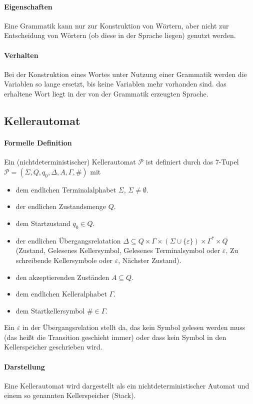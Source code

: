 \paragraph{Eigenschaften}
Eine Grammatik kann nur zur Konstruktion von Wörtern, aber nicht zur Entscheidung von Wörtern (ob diese in der Sprache liegen) genutzt werden.

\paragraph{Verhalten}
Bei der Konstruktion eines Wortes unter Nutzung einer Grammatik werden die Variablen so lange ersetzt, bis keine Variablen mehr vorhanden sind. das erhaltene Wort liegt in der von der Grammatik erzeugten Sprache.


\subsection{Kellerautomat}
\paragraph{Formelle Definition}
Ein (nichtdeterministischer) Kellerautomat $ \mathcal{P} $ ist definiert durch das 7-Tupel $ \mathcal{P} = (\Sigma, Q, q _ 0, \Delta, A, \Gamma, \#) $ mit
\begin{itemize}
	\item dem endlichen Terminalalphabet $ \Sigma $, $ \Sigma \neq \emptyset $.
	\item der endlichen Zustandsmenge $ Q $.
	\item dem Startzustand $ q _ 0 \in Q $.
	\item der endlichen Übergangsrelatation $ \Delta \subseteq Q \times \Gamma \times (\Sigma \cup \{ \varepsilon \}) \times \Gamma ^ * \times Q $ (Zustand, Gelesenes Kellersymbol, Gelesenes Terminalsymbol oder $ \varepsilon $, Zu schreibende Kellersymbole oder $ \varepsilon $, Nächster Zustand).
	\item den akzeptierenden Zuständen $ A \subseteq Q $.
	\item dem endlichen Kelleralphabet $ \Gamma $.
	\item dem Startkellersymbol $ \# \in \Gamma $.
\end{itemize}
Ein $ \varepsilon $ in der Übergangsrelation stellt da, das kein Symbol gelesen werden muss (das heißt die Transition geschieht immer) oder dass kein Symbol in den Kellerspeicher geschrieben wird.

\paragraph{Darstellung}
Eine Kellerautomat wird dargestellt als ein nichtdeterministischer Automat und einem so genannten Kellerspeicher (Stack).

